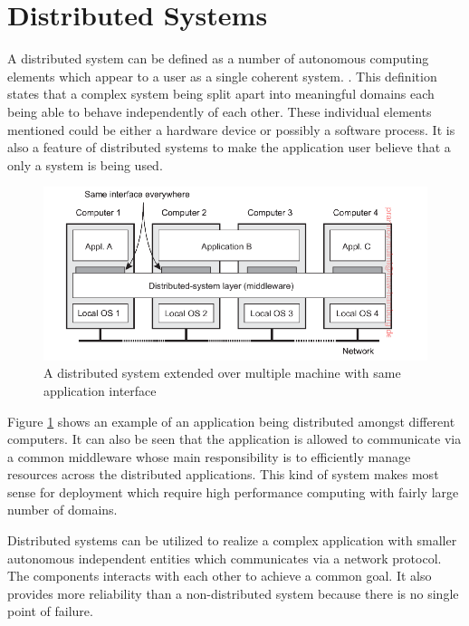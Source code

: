 \section{Distributed Systems}

    A distributed system can be defined as a number of autonomous computing elements which 
    appear to a user as a single coherent system. \cite[p.~2]{DistributedSystems}. 
    This definition states that a complex system being split apart into meaningful domains
    each being able to behave independently of each other. These individual elements 
    mentioned could be either a hardware device or possibly a software process. It is also 
    a feature of distributed systems to make the application user believe that a only a system 
    is being used. 

    \begin{figure}[htbp!]
        \centering \includegraphics[scale=0.94]{grafiken/distributedSystem.png}
        \caption{A distributed system extended over multiple machine with same application interface \cite{DistributedSystems}}
        \label{fig:distributedSystem}
    \end{figure}

    \newpage
    \par
        Figure \ref{fig:distributedSystem} shows an example of an application being 
        distributed amongst different computers. It can also be seen that the application
        is allowed to communicate via a common middleware whose main responsibility is to
        efficiently manage resources across the distributed applications. This kind of system
        makes most sense for deployment which require high performance computing with fairly
        large number of domains\footnotemark[\value{footnote}].

    \par
        Distributed systems can be utilized to realize a complex application with smaller
        autonomous independent entities which communicates via a network protocol. The 
        components interacts with each other to achieve a common goal. It also provides
        more reliability than a non-distributed system because there is no single point
        of failure. 
        

        